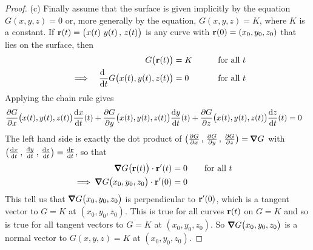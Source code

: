 \begin{proof}
\bigskip
\noindent (c)
Finally assume that the surface is given implicitly by the equation
$G(x,y,z)=0$ or, more generally by the equation, $G(x,y,z) = K$, where $K$ is 
a constant. If $\mathbf{r}(t)=\big(x(t)\,\,y(t)\,,\,z(t)\big)$ is any curve 
with $\mathbf{r}(0) = (x_0,y_0,z_0)$ that lies on the surface, then 
\begin{alignat*}{5}
& & G\big(\vr(t)\big)&=K &\qquad &\text{for all $t$} \\
&\implies & \diff{\ }{t} G\big(x(t),y(t),z(t)\big)&=0 & &\text{for all $t$} 
\end{alignat*}
Applying the chain rule gives
\begin{align*}
\frac{\partial G}{\partial x}\big(x(t),y(t),z(t)\big)\diff{x}{t}(t)
+\frac{\partial G}{\partial y}\big(x(t),y(t),z(t)\big)\diff{y}{t}(t)
+\frac{\partial G}{\partial z}\big(x(t),y(t),z(t)\big)\diff{z}{t}(t)
&=0 
\end{align*}
The left hand side is exactly the dot product
of $\big(\frac{\partial G}{\partial x}
\,,\,\frac{\partial G}{\partial y}
\,,\,\frac{\partial G}{\partial z}\big)=\vnabla G$ 
with
$\big(\diff{x}{t}
\,,\,\diff{y}{t}
\,,\,\diff{z}{t}\big)
=\diff{\vr}{t}$, so that
\begin{align*}
\vnabla G\big(\vr(t)\big)\cdot\vr'(t)&=0 \qquad
          \text{for all $t$} \\
\implies  \vnabla G\big(x_0,y_0,z_0\big)\cdot\vr'(0)&=0 & 
\end{align*}
This tell us that $\vnabla G\big(x_0,y_0,z_0\big)$ is perpendicular
to $\mathbf{r}'(0)$, which is a tangent vector to $G=K$ at $(x_0,y_0,z_0)$.
This is true for all curves $\mathbf{r}(t)$ on $G=K$ and so is true
for all tangent vectors to $G=K$ at $(x_0,y_0,z_0)$.
So $\vnabla G\big(x_0,y_0,z_0\big)$ is a normal vector to $G(x,y,z)=K$ 
at $(x_0,y_0,z_0)$.

\end{proof} 


